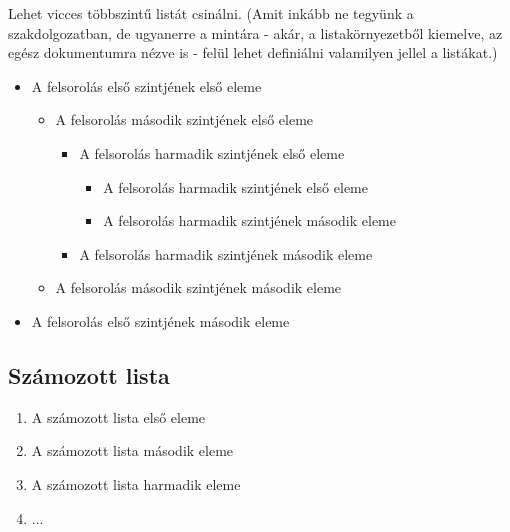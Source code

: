 \documentclass[12pt,a4paper]{article}
\begin{document}
		
		Lehet vicces többszintű listát csinálni. (Amit inkább ne tegyünk a szakdolgozatban, de ugyanerre a mintára - akár, a listakörnyezetből kiemelve, az egész dokumentumra nézve is - felül lehet definiálni valamilyen jellel a listákat.)
        \begin{itemize}
            \renewcommand\labelitemi{\faGlobe}
            \item A felsorolás első szintjének első eleme
            \begin{itemize}
                \renewcommand\labelitemii{\faAndroid}
                \item A felsorolás második szintjének első eleme
                \begin{itemize}
                    \renewcommand\labelitemiii{\faKey}
                    \item A felsorolás harmadik szintjének első eleme
                    \begin{itemize}
                        \renewcommand\labelitemiv{\faStackOverflow}
                        \item A felsorolás harmadik szintjének első eleme
                        \item A felsorolás harmadik szintjének második eleme
                    \end{itemize}
                    \item A felsorolás harmadik szintjének második eleme
                \end{itemize}
                \item A felsorolás második szintjének második eleme
            \end{itemize}
          \item A felsorolás első szintjének második eleme
        \end{itemize}
		
	\subsection{Számozott lista}
		
		\begin{enumerate}
			\item A számozott lista első eleme
			\item A számozott lista második eleme
			\item A számozott lista harmadik eleme
			\item ...
		\end{enumerate}
		
\end{document}
